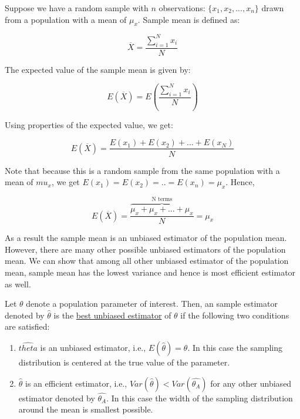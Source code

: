 \documentclass[]{book}
\theoremstyle{definition}
\theoremstyle{definition}
\theoremstyle{definition}
\theoremstyle{remark}
\let\BeginKnitrBlock\begin \let\EndKnitrBlock\end
\begin{document}
\BeginKnitrBlock{example}
\protect\hypertarget{exm:unnamed-chunk-60}{}{\label{exm:unnamed-chunk-60} }Suppose we have a random sample with \(n\) observations: \(\{x_1,x_2,...,x_n\}\) drawn from a population with a mean of \(\mu_x\). Sample mean is defined as:

\[\overline{X}=\frac{\sum_{i=1}^N x_i}{N}\]

The expected value of the sample mean is given by:

\[E(\overline{X})=E\left(\frac{\sum_{i=1}^N x_i}{N}\right)\]

Using properties of the expected value, we get:

\[E(\overline{X})=\frac{E(x_1)+E(x_2)+...+ E(x_N)}{N}\]

Note that because this is a random sample from the same population with a mean of \(mu_x\), we get \(E(x_1)=E(x_2)=..=E(x_n)=\mu_x\). Hence,

\[E(\overline{X})=\frac{\overbrace{\mu_x+\mu_x+...+\mu_x}^{\text{N terms}} }{N}=\mu_x\]

As a result the sample mean is an unbiased estimator of the population mean. However, there are many other possible unbiased estimators of the population mean. We can show that among all other unbiased estimator of the population mean, sample mean has the lowest variance and hence is most efficient estimator as well.
\EndKnitrBlock{example}

\BeginKnitrBlock{definition}[Best Unbiased Estimator (BUE)]
\protect\hypertarget{def:unnamed-chunk-61}{}{\label{def:unnamed-chunk-61} {} }Let \(\theta\) denote a population parameter of interest. Then, an sample estimator denoted by \(\hat{\theta}\) is the \underline{best unbiased estimator} of \(\theta\) if the following two conditions are satisfied:

\begin{enumerate}
\def\labelenumi{\arabic{enumi}.}
\item
  \(\hat{theta}\) is an unbiased estimator, i.e., \(E(\hat{\theta})=\theta\). In this case the sampling distribution is centered at the true value of the parameter.
\item
  \(\hat{\theta}\) is an efficient estimator, i.e., \(Var(\hat{\theta})< Var(\hat{\theta_A})\) for any other unbiased estimator denoted by \(\hat{\theta_A}\). In this case the width of the sampling distribution around the mean is smallest possible.
\end{enumerate}
\EndKnitrBlock{definition}
\end{document}
